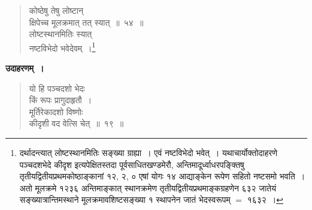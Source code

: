 \documentclass[11pt, openany]{book}
\begin{document}
\newpage

\begin{quote}
{\gk कोष्ठेषु तेषु लोष्टान्\\
क्षिपेच्च मूलक्रमात् तत् स्यात्~॥~५४~॥\\
लोष्टस्थानमितिः स्यात्\\
नष्टविभेदो भवेदेवम्~।}\renewcommand{\thefootnote}{}\footnote{\hspace{-8.5mm} दर्थादन्त्यात् लोष्टस्थानमितिः सङ्ख्या ग्राह्या~। एवं नष्टविभेदो भवेत्~। यथाचार्योक्तोदाहरणे पञ्चदशभेदे कीदृश इत्यपेक्षितस्तदा पूर्वसाधितखण्डमेरौ, अन्तिमादूर्ध्वाधरपङ्क्तिषु तृतीयद्वितीयप्रथमकोष्ठाङ्कानां १२, २, ० एषां योगः १४ आद्याङ्केन रूपेण सहितो नष्टसमो भवति~। अतो मूलक्रमे १२३६ अन्तिमाङ्कात् स्थानक्रमेण तृतीयद्वितीयप्रथमाङ्कग्रहणेन ६३२ जातेयं सङ्ख्यात्रान्तिमस्थाने मूलक्रमावशिष्टसङ्ख्या १ स्थापनेन जातं भेदस्वरूपम् $=$ १६३२~।}
\end{quote}

\textbf{उदाहरणम्~।}

\begin{quote} 
{\ex यो हि पञ्चदशो भेदः\\
किं रूपः प्रागुदाहृतौ~।\\
मूर्तिरेकादशो विष्णोः\\
कीदृशी वद वेत्सि चेत्~॥~१९~॥}
\end{quote}
\end{document}
